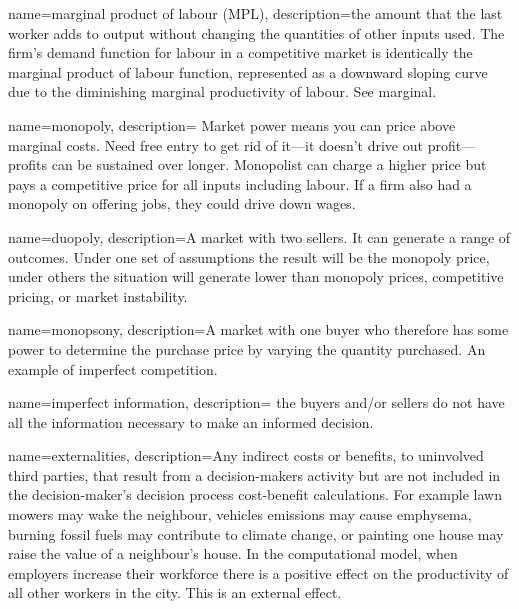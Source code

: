 
{
name=marginal product of labour (MPL),
description={the amount that the last worker  adds to output without changing the quantities of other inputs used. The firm's \gls{demand function} for labour in a competitive market is identically  the \gls{marginal product} of labour function, represented as a downward sloping curve due to the diminishing marginal productivity of labour. See \gls{marginal}.}
}

{
name=monopoly,
description={ Market power means you can price above marginal costs. Need free entry to get rid of it---it doesn't drive out profit---profits can be sustained over longer. Monopolist can charge a higher price but pays a competitive price for all \glspl{input} including labour. If a firm also had a monopoly on offering jobs, they could drive down wages.}
}

{
name=duopoly,
description={A market with two sellers. It can generate a range of outcomes. Under one set of assumptions the result will be the monopoly price, under others the situation will generate lower than monopoly prices, competitive pricing, or market instability.}
}

{
name=monopsony,
description={A market with one buyer who therefore has some power to determine the purchase price by varying the quantity purchased. An example of \gls{imperfect competition}.}
}

{
name=imperfect information,
description={ the buyers and/or sellers do not have all the information necessary to make an informed decision.}
}

{
name=externalities,
description={Any indirect costs or benefits, to uninvolved third parties, that result from a decision-makers activity but are not included in the decision-maker's decision process cost-benefit calculations. For example lawn mowers may wake the neighbour, vehicles emissions may cause emphysema, burning fossil fuels may contribute to climate change, or painting one house may raise the value of a neighbour's house. In the computational model, when employers increase their workforce there is a positive effect on the productivity of all other workers in the city. This is an external effect.}
}

